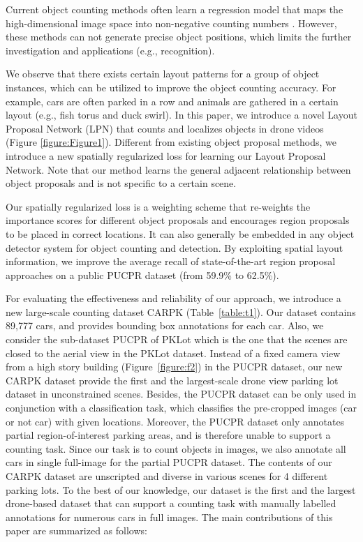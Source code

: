\documentclass[10pt,twocolumn,letterpaper]{article}
\begin{document}
Current object counting methods often learn a regression model that maps the high-dimensional image space into non-negative counting numbers \cite{39_wang2011automatic,04_mundhenk2016large}.
%
However, these methods can not generate precise object positions, which limits the further investigation and applications (e.g., recognition). 

We observe that there exists certain layout patterns for a group of object instances, which can be utilized to improve the object counting accuracy.  
%
For example, cars are often parked in a row and animals are gathered in a certain layout (e.g., fish torus and duck swirl). 
%
In this paper, we introduce a novel Layout Proposal Network (LPN) that counts and localizes objects in drone videos (Figure \ref{figure:Figure1}).
%
Different from existing object proposal methods, we introduce a new spatially regularized loss for learning our Layout Proposal Network. Note that our method learns the general adjacent relationship between object proposals and is not specific to a certain scene.  

Our spatially regularized loss is a weighting scheme that re-weights the importance scores for different object proposals and encourages region proposals to be placed in correct locations. 
%
It can also generally be embedded in any object detector system for object counting and detection. 
%
By exploiting spatial layout information, we improve the average recall of state-of-the-art region proposal approaches on a public PUCPR dataset \cite{01_de2015pklot} (from 59.9\% to 62.5\%). 

For evaluating the effectiveness and reliability of our approach, we introduce a new large-scale counting dataset CARPK (Table~\ref{table:t1}). 
%
Our dataset contains 89,777 cars, and provides bounding box annotations for each car.
%
Also, we consider the sub-dataset PUCPR of PKLot \cite{01_de2015pklot} which is the one that the scenes are closed to the aerial view in the PKLot dataset. Instead of a fixed camera view from a high story building (Figure~\ref{figure:f2}) in the PUCPR dataset, our new CARPK dataset provide the first and the largest-scale drone view parking lot dataset in unconstrained scenes.
%
Besides, the PUCPR dataset can be only used in conjunction with a classification task, which classifies the pre-cropped images (car or not car) with given locations. 
%
Moreover, the PUCPR dataset only annotates partial region-of-interest parking areas, and is therefore unable to support a counting task. 
%
Since our task is to count objects in images, we also annotate all cars in single full-image for the partial PUCPR dataset. 
%
The contents of our CARPK dataset are unscripted and diverse in various scenes for 4 different parking lots. 
%
To the best of our knowledge, our dataset is the first and the largest drone-based dataset that can support a counting task with manually labelled annotations for numerous cars in full images. 
%
The main contributions of this paper are summarized as follows:
 
\end{document}
